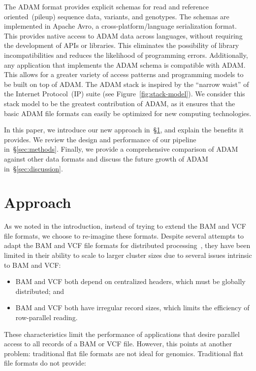 \documentclass{bioinfo}
\begin{document}
The ADAM format provides explicit schemas for read and reference oriented~(pileup) sequence data, variants, and genotypes. The schemas are implemented in Apache
Avro, a cross-platform/language serialization format. This provides native access to ADAM data across languages, without requiring the development of APIs or libraries.
This eliminates the possibility of library incompatibilities and reduces the likelihood of programming errors. Additionally, any application that implements the
ADAM schema is compatible with ADAM. This allows for a greater variety of access patterns and programming models to be built on top of ADAM. The ADAM stack is inspired
by the ``narrow waist'' of the Internet Protocol~(IP) suite (see Figure~\ref{fig:stack-model}). We consider this stack model to be the greatest contribution of ADAM, as it ensures
that the basic ADAM file formats can easily be optimized for new computing technologies.

In this paper, we introduce our new approach in~\S\ref{sec:approach}, and explain the benefits it provides. We review the design and performance of our pipeline
in~\S\ref{sec:methods}. Finally, we provide a comprehensive comparison of ADAM against other data formats and discuss the future growth of ADAM in~\S\ref{sec:discussion}.

\section{Approach}
\label{sec:approach}

As we noted in the introduction, instead of trying to extend the BAM and VCF file formats, we choose to re-imagine these formats. Despite several attempts to adapt the
BAM and VCF file formats for distributed processing~\citep[see][]{niemenmaa12}, they have been limited in their ability to scale to larger cluster sizes due to several issues
intrinsic to BAM and VCF:

\begin{itemize}
\item BAM and VCF both depend on centralized headers, which must be globally distributed; and
\item BAM and VCF both have irregular record sizes, which limits the efficiency of row-parallel reading. 
\end{itemize}

These characteristics limit the performance of applications that desire parallel access to all records of a BAM or VCF file. However, this points at another problem: traditional
flat file formats are not ideal for genomics. Traditional flat file formats do not provide:
\end{document}
